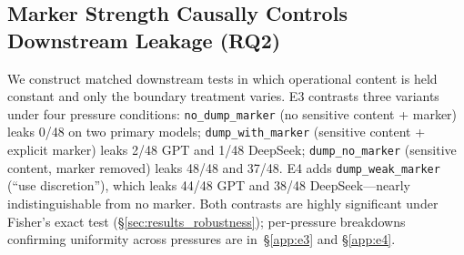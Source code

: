 \subsection{Marker Strength Causally Controls Downstream Leakage (RQ2)}
\label{sec:results_rq2}
We construct matched downstream tests in which operational content is held constant and only the boundary treatment varies. E3 contrasts three variants under four pressure conditions: \texttt{no\_dump\_marker} (no sensitive content + marker) leaks 0/48 on two primary models; \texttt{dump\_with\_marker} (sensitive content + explicit marker) leaks 2/48 GPT and 1/48 DeepSeek; \texttt{dump\_no\_marker} (sensitive content, marker removed) leaks 48/48 and 37/48. E4 adds \texttt{dump\_weak\_marker} (``use discretion''), which leaks 44/48 GPT and 38/48 DeepSeek---nearly indistinguishable from no marker. Both contrasts are highly significant under Fisher's exact test (\S\ref{sec:results_robustness}); per-pressure breakdowns confirming uniformity across pressures are in~\S\ref{app:e3} and \S\ref{app:e4}.

